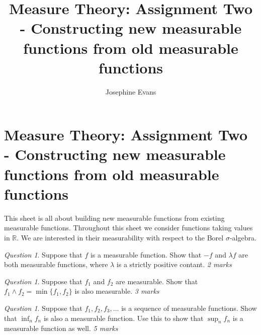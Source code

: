 \documentclass[11pt]{article}
\author{
Josephine Evans
}
\title{Measure Theory: Assignment Two - Constructing new measurable functions from old measurable functions}
\theoremstyle{definition}
\theoremstyle{remark}
\newtheorem{q}[thm]{Question}
\begin{document}
\section{Measure Theory: Assignment Two - Constructing new measurable functions from old measurable functions}This sheet is all about building new measurable functions from existing measurable functions. Throughout this sheet we consider functions taking values in $\mathbb{R}$. We are interested in their measurability with respect to the Borel $\sigma$-algebra.
\begin{q}
Suppose that $f$ is a measurable function. Show that $-f$ and $\lambda f$ are both measurable functions, where $\lambda$ is a strictly positive contant. \emph{2 marks}
\end{q}


\begin{q}
Suppose that $f_1$ and $f_2$ are measurable. Show that $f_1 \wedge f_2 = \min\{f_1, f_2\}$ is also measurable. \emph{3 marks}
\end{q}

\begin{q}
Suppose that $f_1, f_2, f_3, \dots$ is a sequence of measurable functions. Show that $\inf_n f_n$ is also a measurable function. Use this to show that $\sup_n f_n$ is a measurable function as well. \emph{5 marks}
\end{q}
\end{document}
